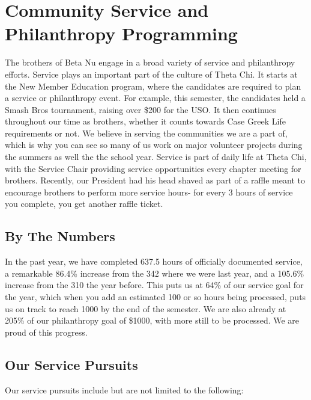 \chapter{Community Service and Philanthropy Programming}

  The brothers of Beta Nu engage in a broad variety of service and philanthropy efforts. Service plays an important part of the culture of Theta Chi. It starts at the New Member Education program, where the candidates are required to plan a service or philanthropy event. For example, this semester, the candidates held a Smash Bros tournament, raising over \$200 for the USO. It then continues throughout our time as brothers, whether it counts towards Case Greek Life requirements or not. We believe in serving the communities we are a part of, which is why you can see so many of us work on major volunteer projects during the summers as well the the school year. Service is part of daily life at Theta Chi, with the Service Chair providing service opportunities every chapter meeting for brothers. Recently, our President had his head shaved as part of a raffle meant to encourage brothers to perform more service hours- for every 3 hours of service you complete, you get another raffle ticket.
  
  \section*{By The Numbers}
  In the past year, we have completed 637.5 hours of officially documented service, a remarkable  86.4\% increase from the 342 where we were last year, and a 105.6\% increase from the 310 the year before. This puts us at 64\% of our service goal for the year, which when you add an estimated 100 or so hours being processed, puts us on track to reach 1000 by the end of the semester. We are also already at 205\% of our philanthropy goal of \$1000, with more still to be processed. We are proud of this progress.
  
  \section*{Our Service Pursuits}
   Our service pursuits include but are not limited to the following:
      
